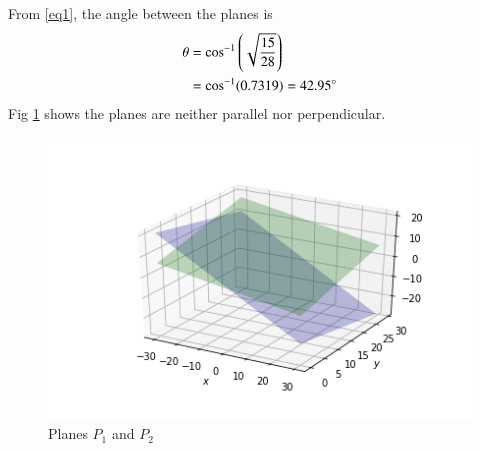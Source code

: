 \documentclass[journal,12pt,twocolumn]{IEEEtran}
\begin{document}
From \ref{eq1}, the angle between the planes is
\begin{align}
 \theta &=\cos^{-1}\left(\sqrt{\frac{15}{28}}\right)
   \\ &=\cos^{-1}(0.7319)=42.95\degree
\end{align}
Fig \ref{fig:1} shows the planes are neither parallel nor perpendicular.
\begin{figure}[!ht]
\centering
    \includegraphics[width= \columnwidth]{assignment4.png}
    \caption{Planes $P_1$ and $P_2$} \label{fig:1}
\end{figure}
\end{document}
